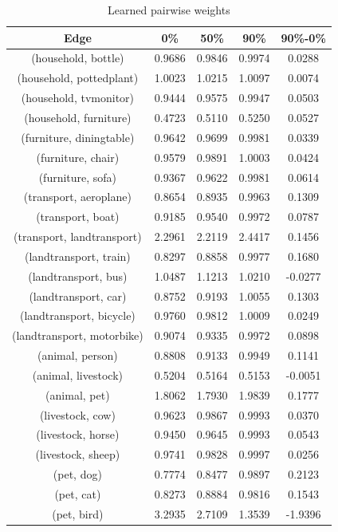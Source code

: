 \documentclass[11pt,a4paper]{article}
\begin{document}
\begin{table}[htbp]
\centering
\begin{tabular}{c|c|c|c|c}
Edge & 0\% & 50\% & 90\% & 90\%-0\%\\\hline
(household, bottle)        & 0.9686 & 0.9846 & 0.9974 & 0.0288\\
(household, pottedplant)   & 1.0023 & 1.0215 & 1.0097 & 0.0074\\
(household, tvmonitor)     & 0.9444 & 0.9575 & 0.9947 & 0.0503\\
(household, furniture)     & 0.4723 & 0.5110 & 0.5250 & 0.0527\\
(furniture, diningtable)   & 0.9642 & 0.9699 & 0.9981 & 0.0339\\
(furniture, chair)         & 0.9579 & 0.9891 & 1.0003 & 0.0424\\
(furniture, sofa)          & 0.9367 & 0.9622 & 0.9981 & 0.0614\\
(transport, aeroplane)     & 0.8654 & 0.8935 & 0.9963 & 0.1309\\
(transport, boat)          & 0.9185 & 0.9540 & 0.9972 & 0.0787\\
(transport, landtransport) & 2.2961 & 2.2119 & 2.4417 & 0.1456\\
(landtransport, train)     & 0.8297 & 0.8858 & 0.9977 & 0.1680\\
(landtransport, bus)       & 1.0487 & 1.1213 & 1.0210 & -0.0277\\
(landtransport, car)       & 0.8752 & 0.9193 & 1.0055 & 0.1303\\
(landtransport, bicycle)   & 0.9760 & 0.9812 & 1.0009 & 0.0249\\
(landtransport, motorbike) & 0.9074 & 0.9335 & 0.9972 & 0.0898\\
(animal, person)           & 0.8808 & 0.9133 & 0.9949 & 0.1141\\
(animal, livestock)        & 0.5204 & 0.5164 & 0.5153 & -0.0051\\
(animal, pet)              & 1.8062 & 1.7930 & 1.9839 & 0.1777\\
(livestock, cow)           & 0.9623 & 0.9867 & 0.9993 & 0.0370\\
(livestock, horse)         & 0.9450 & 0.9645 & 0.9993 & 0.0543\\
(livestock, sheep)         & 0.9741 & 0.9828 & 0.9997 & 0.0256\\
(pet, dog)                 & 0.7774 & 0.8477 & 0.9897 & 0.2123\\
(pet, cat)                 & 0.8273 & 0.8884 & 0.9816 & 0.1543\\
(pet, bird)                & 3.2935 & 2.7109 & 1.3539 & -1.9396
\end{tabular}
\caption{Learned pairwise weights}
\label{tab:pairwise}
\end{table}
\end{document}
